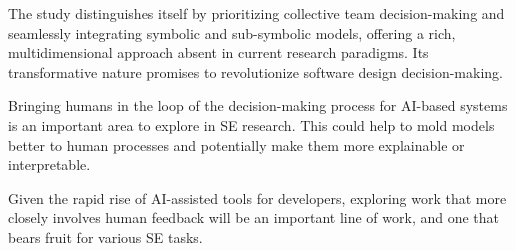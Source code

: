 
 



 



 
The study distinguishes itself by prioritizing collective team decision-making and seamlessly integrating symbolic and sub-symbolic models, offering a rich, multidimensional approach absent in current research paradigms. Its transformative nature promises to revolutionize software design decision-making. 


 Bringing humans in the loop of the decision-making process for AI-based systems is an important area to explore in SE research. This could help to mold models better to human processes and potentially make them more explainable or interpretable.
 
 Given the rapid rise of AI-assisted tools for developers, exploring work that more closely involves human feedback will be an important line of work, and one that bears fruit for various SE tasks.


